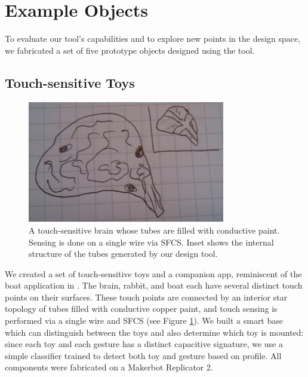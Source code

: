 \section{Example Objects}

To evaluate our tool's capabilities and to explore new points in the design space, we fabricated a set of five prototype objects designed using the tool.


\subsection{Touch-sensitive Toys}

\begin{figure}[h]
\centering
    \includegraphics[width=3.4in]{figures/placeholder/brain.jpg}
\caption{A touch-sensitive brain whose tubes are filled with conductive paint.  Sensing is done on a single wire via SFCS.  Inset shows the internal structure of the tubes generated by our design tool.}
\label{fig:toys}
\end{figure}


We created a set of touch-sensitive toys and a companion app, reminiscent of the boat application in \cite{Harrison-acoustic}.  The brain, rabbit, and boat each have several distinct touch points on their surfaces.  These touch points are connected by an interior star topology of tubes filled with conductive copper paint, and touch sensing is performed via a single wire and SFCS (see Figure \ref{fig:toys}).  We built a smart base which can distinguish between the toys and also determine which toy is mounted: since each toy and each gesture has a distinct capacitive signature, we use a simple classifier trained to detect both toy and gesture based on profile.  All components were fabricated on a Makerbot Replicator 2.

